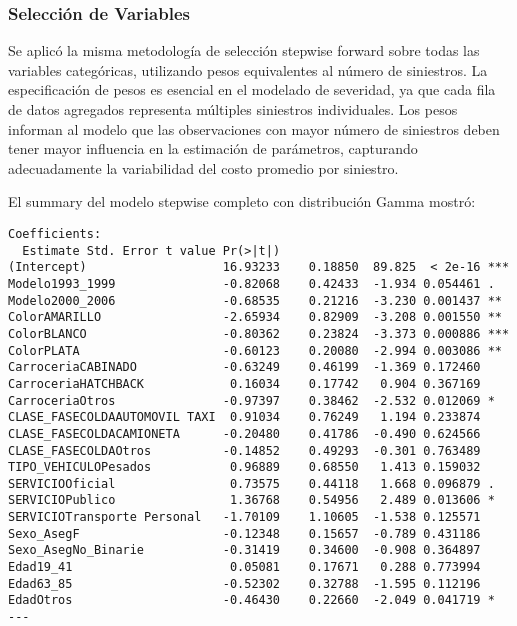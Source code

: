 \subsubsection{Selección de Variables}

Se aplicó la misma metodología de selección stepwise forward sobre todas las variables categóricas, utilizando pesos equivalentes al número de siniestros. La especificación de pesos es esencial en el modelado de severidad, ya que cada fila de datos agregados representa múltiples siniestros individuales. Los pesos informan al modelo que las observaciones con mayor número de siniestros deben tener mayor influencia en la estimación de parámetros, capturando adecuadamente la variabilidad del costo promedio por siniestro.

El summary del modelo stepwise completo con distribución Gamma mostró:

\begin{lstlisting}[style=Routput]
  Coefficients:
  Estimate Std. Error t value Pr(>|t|)    
(Intercept)                   16.93233    0.18850  89.825  < 2e-16 ***
Modelo1993_1999               -0.82068    0.42433  -1.934 0.054461 .  
Modelo2000_2006               -0.68535    0.21216  -3.230 0.001437 ** 
ColorAMARILLO                 -2.65934    0.82909  -3.208 0.001550 ** 
ColorBLANCO                   -0.80362    0.23824  -3.373 0.000886 ***
ColorPLATA                    -0.60123    0.20080  -2.994 0.003086 ** 
CarroceriaCABINADO            -0.63249    0.46199  -1.369 0.172460    
CarroceriaHATCHBACK            0.16034    0.17742   0.904 0.367169    
CarroceriaOtros               -0.97397    0.38462  -2.532 0.012069 *  
CLASE_FASECOLDAAUTOMOVIL TAXI  0.91034    0.76249   1.194 0.233874    
CLASE_FASECOLDACAMIONETA      -0.20480    0.41786  -0.490 0.624566    
CLASE_FASECOLDAOtros          -0.14852    0.49293  -0.301 0.763489    
TIPO_VEHICULOPesados           0.96889    0.68550   1.413 0.159032    
SERVICIOOficial                0.73575    0.44118   1.668 0.096879 .  
SERVICIOPublico                1.36768    0.54956   2.489 0.013606 *  
SERVICIOTransporte Personal   -1.70109    1.10605  -1.538 0.125571    
Sexo_AsegF                    -0.12348    0.15657  -0.789 0.431186    
Sexo_AsegNo_Binarie           -0.31419    0.34600  -0.908 0.364897    
Edad19_41                      0.05081    0.17671   0.288 0.773994    
Edad63_85                     -0.52302    0.32788  -1.595 0.112196    
EdadOtros                     -0.46430    0.22660  -2.049 0.041719 *  
---
\end{lstlisting}

